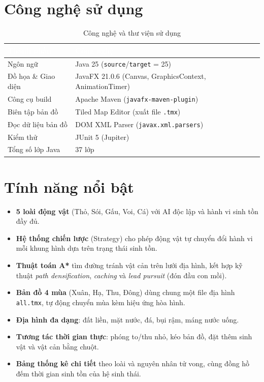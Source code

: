 \documentclass[12pt,a4paper]{report}
\newcommand{\keyword}[1]{\textcolor{primaryblue}{\textbf{#1}}}
\newcommand{\code}[1]{\texttt{\small #1}}
\begin{document}
\section{Công nghệ sử dụng}

\begin{table}[H]
\centering
\caption{Công nghệ và thư viện sử dụng}
\begin{tabular}{L{4cm} L{8.5cm}}
\toprule
{}\textcolor{white}{\textbf{Thành phần}} & \textcolor{white}{\textbf{Công nghệ}} \\
\midrule
Ngôn ngữ & Java 25 (\code{source}/\code{target} = 25) \\
 Đồ họa \& Giao diện & JavaFX 21.0.6 (Canvas, GraphicsContext, AnimationTimer) \\
Công cụ build & Apache Maven (\code{javafx-maven-plugin}) \\
 Biên tập bản đồ & Tiled Map Editor (xuất file \code{.tmx}) \\
Đọc dữ liệu bản đồ & DOM XML Parser (\code{javax.xml.parsers}) \\
 Kiểm thử & JUnit 5 (Jupiter) \\
Tổng số lớp Java & 37 lớp \\
\bottomrule
\end{tabular}
\end{table}

\section{Tính năng nổi bật}

\begin{itemize}[leftmargin=1.5em]
    \item \keyword{5 loài động vật} (Thỏ, Sói, Gấu, Voi, Cá) với AI độc lập và hành vi sinh tồn đầy đủ.
    \item \keyword{Hệ thống chiến lược} (Strategy) cho phép động vật tự chuyển đổi hành vi mỗi khung hình dựa trên trạng thái sinh tồn.
    \item \keyword{Thuật toán A*} tìm đường tránh vật cản trên lưới địa hình, kết hợp kỹ thuật \textit{path densification}, \textit{caching} và \textit{lead pursuit} (đón đầu con mồi).
    \item \keyword{Bản đồ 4 mùa} (Xuân, Hạ, Thu, Đông) dùng chung một file địa hình \code{all.tmx}, tự động chuyển mùa kèm hiệu ứng hòa hình.
    \item \keyword{Địa hình đa dạng}: đất liền, mặt nước, đá, bụi rậm, máng nước uống.
    \item \keyword{Tương tác thời gian thực}: phóng to/thu nhỏ, kéo bản đồ, đặt thêm sinh vật và vật cản bằng chuột.
    \item \keyword{Bảng thống kê chi tiết} theo loài và nguyên nhân tử vong, cùng đồng hồ đếm thời gian sinh tồn của hệ sinh thái.
\end{itemize}
\end{document}
